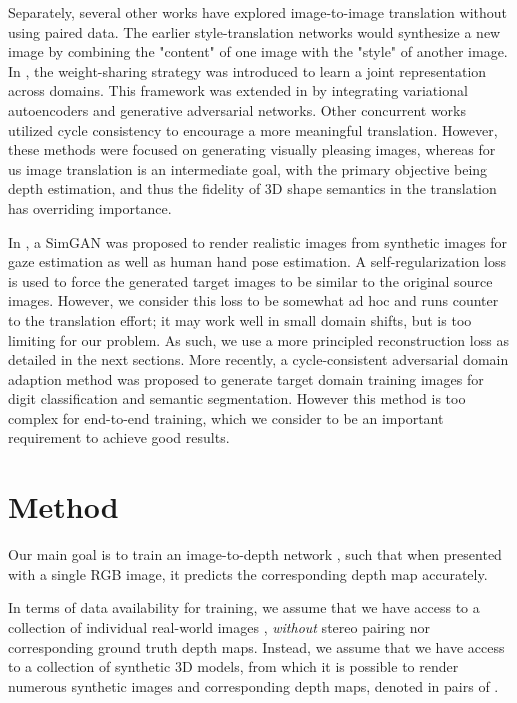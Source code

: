 \documentclass[runningheads]{llncs}
\begin{document}
Separately, several other works have explored image-to-image translation without using paired data. The earlier style-translation networks \cite{gatys2016image,johnson2016perceptual} would synthesize a new image by combining the "content" of one image with the "style" of another image. 
In \cite{liu2016coupled}, the weight-sharing strategy was introduced to learn a joint representation across domains. This framework was extended in \cite{liu2017unsupervised} by integrating variational autoencoders and generative adversarial networks. Other concurrent works \cite{zhu2017unpaired,kim2017learning,yi2017dualgan} utilized cycle consistency to encourage a more meaningful translation. However, these methods were focused on generating visually pleasing images, whereas for us image translation is an intermediate goal, with the primary objective being depth estimation, and thus the fidelity of 3D shape semantics in the translation has overriding importance.

In \cite{shrivastava2017learning}, a SimGAN was proposed to render realistic images from synthetic images for gaze estimation as well as human hand pose estimation. A self-regularization loss is used to force the generated target images to be similar to the original source images. However, we consider this loss to be somewhat ad hoc and runs counter to the translation effort; it may work well in small domain shifts, but is too limiting for our problem. As such, we use a more principled reconstruction loss as detailed in the next sections. More recently, a cycle-consistent adversarial domain adaption method was proposed \cite{hoffman2017cycada} to generate target domain training images for digit classification and semantic segmentation. However this method is too complex for end-to-end training, which we consider to be an important requirement to achieve good results.

\section{Method}

Our main goal is to train an image-to-depth network , such that when presented with a single RGB image, it predicts the corresponding depth map accurately.

In terms of data availability for training, we assume that we have access to a collection of individual real-world images , \emph{without} stereo pairing nor corresponding ground truth depth maps. Instead, we assume that we have access to a collection of synthetic 3D models, from which it is possible to render numerous synthetic images and corresponding depth maps, denoted in pairs of .
\end{document}
